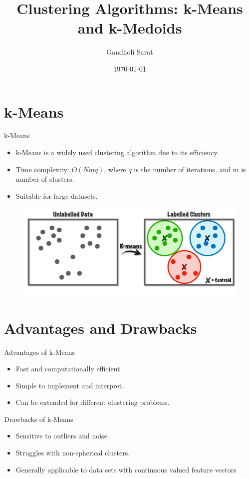\documentclass{beamer}
\title{Clustering Algorithms: k-Means and k-Medoids}
\author{Gandholi Sarat}
\institute{Sri Sathya Sai Institute of Higher Learning}
\date{\today}
\begin{document}
\begin{frame}
    \titlepage
\end{frame}

\section{k-Means}
\begin{frame}{k-Means}
    \begin{itemize}
        \item k-Means is a widely used clustering algorithm due to its efficiency.
        \item Time complexity: \(O(Nmq)\), where \(q\) is the number of iterations, and m is number of clusters.
        \item Suitable for large datasets.
    \end{itemize}
    \begin{figure}
        \centering
        \includegraphics[width=0.8\linewidth]{1.png}
    \end{figure}
\end{frame}


\section{Advantages and Drawbacks}
\begin{frame}{Advantages of k-Means}
    \begin{itemize}
        \item Fast and computationally efficient.
        \item Simple to implement and interpret.
        \item Can be extended for different clustering problems.
    \end{itemize}
\end{frame}

\begin{frame}{Drawbacks of k-Means}
    \begin{itemize}
        \item Sensitive to outliers and noise.
        \item Struggles with non-spherical clusters.
        \item Generally applicable to data sets with continuous valued feature vectors
    \end{itemize}
\end{frame}
\end{document}
